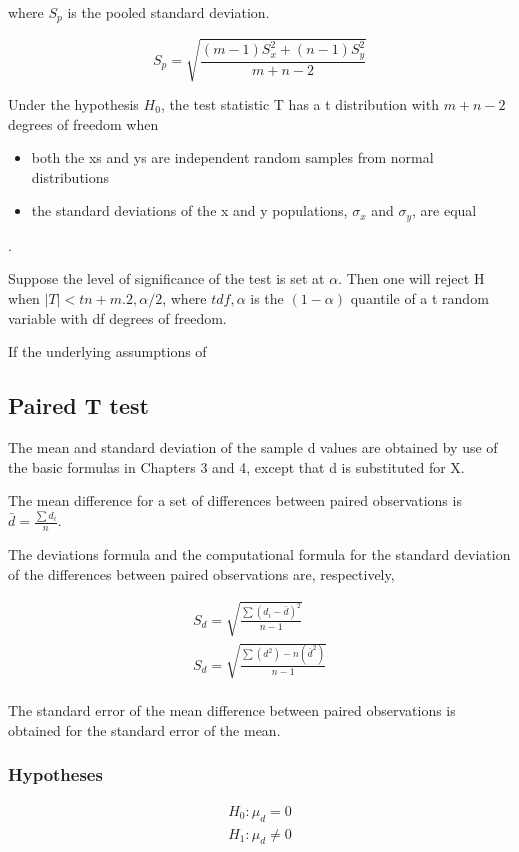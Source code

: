 where $S_{p}$ is the pooled standard deviation.

\begin{equation}
S_{p} = \sqrt{ \frac{(m-1)S^{2}_{x} +  (n-1)S^{2}_{y}}{m + n - 2}}
\end{equation}

Under the hypothesis $H_{0}$, the test statistic T has a t
distribution with $m + n - 2$ degrees of freedom when
\begin{itemize} \item both the xs and ys are independent random samples
from normal distributions \item the standard deviations of the x
and y populations, $\sigma_{x}$ and $\sigma_{y}$, are equal
\end{itemize}.

Suppose the level of significance of the test is set at $\alpha$.
Then one will reject H when $|T| < tn+m.2,\alpha/2$, where
$tdf,\alpha$ is the $(1 - \alpha)$ quantile of a t random variable
with df degrees of freedom.

If the underlying assumptions of

\subsection{Paired T test}
The mean and standard deviation of the sample d values are
obtained by use of the basic formulas in Chapters 3 and 4, except
that d is substituted for X.

The mean difference for a set of differences between paired
observations is $\bar{d} = \frac{\sum d_{i}}{n}$.

The deviations formula and the computational formula for the
standard deviation of the differences between paired observations
are, respectively,

\begin{eqnarray}
S_{d} = \sqrt{\frac{\sum (d_{i}-\bar{d})^2}{n-1}}\\
S_{d} = \sqrt{\frac{ \sum (d^2)- n(\bar{d}^2)}{n-1}}\\
\end{eqnarray}

The standard error of the mean difference between paired
observations is obtained for the standard error of the mean.
\subsubsection{Hypotheses}
\begin{eqnarray*}
H_{0}: \mu_{d} = 0\\
H_{1}: \mu_{d} \neq 0\\
\end{eqnarray*}

